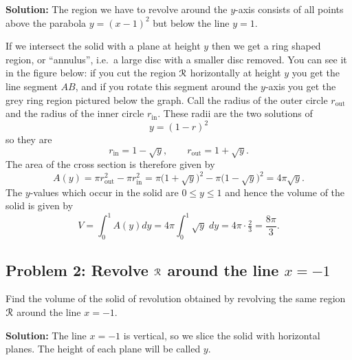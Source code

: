 \textbf{Solution: } The region we have to revolve around the $y$-axis consists
of all points above the parabola $y=(x-1)^2$ but below the line $y=1$.

If we intersect the solid with a plane at height $y$ then we get a ring shaped
region, or ``annulus'', i.e.\ a large disc with a smaller disc removed.  You can
see it in the figure below: if you cut the region $\mathcal{R}$ horizontally at height
$y$ you get the line segment $AB$, and if you rotate this segment around the
$y$-axis you get the grey ring region pictured below the graph.  Call the radius
of the outer circle $r_{\textrm{out}}$ and the radius of the inner circle
$r_{\textrm{in}}$.  These radii are the two solutions of
\[
y = (1-r)^2
\]
so they are
\[
r_{\textrm{in}} = 1-\sqrt y, \qquad r_{\textrm{out}} = 1+\sqrt y.
\]
The area of the cross section is therefore given by
\[
A(y) = \pi r_{\textrm{out}}^2 - \pi r_{\textrm{in}}^2 =\pi\bigl(1+\sqrt{y}\bigr)^2 - \pi\bigl(1-\sqrt{y}\bigr)^2 =4\pi\sqrt{y}.
\]
The $y$-values which occur in the solid are $0\leq y\leq 1$ and hence the volume
of the solid is given by
\[
V = \int_0^1 A(y) dy = 4\pi \int_0^1\sqrt y\; dy = 4\pi \cdot \tfrac23 =
\frac{8\pi}3.
\]

\subsection{Problem 2: Revolve $\mathcal{R}$ around the line $x=-1$} %
Find the volume of the solid of revolution obtained by revolving the same region
$\mathcal{R}$ around the line $x=-1$.

\textbf{Solution: } The line $x=-1$ is vertical, so we slice the solid with
horizontal planes.  The height of each plane will be called $y$.

